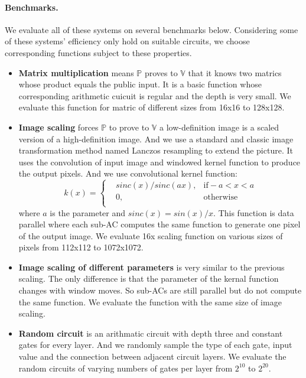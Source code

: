 \paragraph{Benchmarks.} We evaluate all of these systems on several benchmarks below. Considering some of these systems' efficiency only hold on suitable circuits, we choose corresponding functions subject to these properties. 
 \begin{itemize}
	\item
	\textbf{Matrix multiplication} means $\mathbb{P}$ proves to $\mathbb{V}$ that it knows two matrics whose product equals the public input. It is a basic function whose corresponding arithmetic cuicuit is regular and the depth is very small. We evaluate this function for matric of different sizes from 16x16 to 128x128. 
	\item
	\textbf{Image scaling} forces $\mathbb{P}$ to prove to $\mathbb{V}$ a low-definition image is a scaled version of a high-definition image. And we use a standard and classic image transformation method named Lanczos resampling\cite{Lanczos} to extend the picture. It uses the convolution of input image and windowed kernel function to produce the output pixels. And we use convolutional kernel function:
	\begin{equation}
	k(x)=\left\{
	\begin{aligned}
	&sinc(x)/sinc(ax), &\text{if} -a < x < a\\
	&0, &\text{otherwise}\\
	\end{aligned}
	\right.
	\end{equation}
	where $a$ is the parameter and $sinc(x) = sin(x)/x$. This function is data parallel where each sub-AC computes the same function to generate one pixel of the output image. We evaluate 16x scaling function on various sizes of pixels from 112x112 to 1072x1072.
	\item
	\textbf{Image scaling of different parameters} is very similar to the previous scaling. The only difference is that the parameter of the kernal function changes with window moves.
	So sub-ACs are still parallel but do not compute the same function. We evaluate the function with the same size of image scaling.
	\item
	\textbf{Random circuit} is an arithmatic circuit with depth three and constant gates for every layer. And we randomly sample the type of each gate, input value and the connection between adjacent circuit layers. We evaluate the random circuits of varying numbers of gates per layer from $2^{10}$ to $2^{20}$.
\end{itemize}
